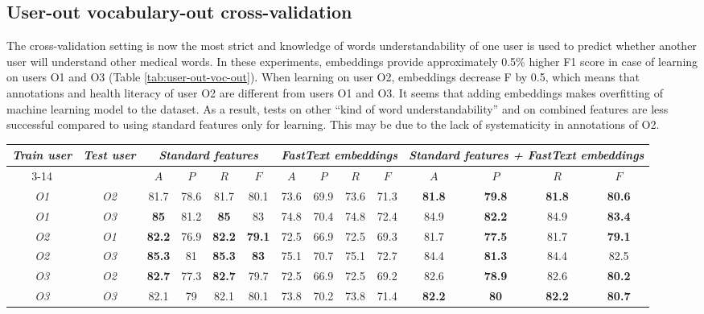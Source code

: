 \subsection{User-out vocabulary-out cross-validation}

The cross-validation setting is now the most strict and knowledge of words understandability of one user is used to predict whether another user will understand other medical words. In these experiments, embeddings provide approximately 0.5\% higher F1 score in case of learning on users O1 and O3 (Table \ref{tab:user-out-voc-out}). When learning on user O2, embeddings decrease F by 0.5, which means that annotations and health literacy of user O2 are different from users O1 and O3. It seems that adding embeddings makes overfitting of machine learning model to the dataset. As a result, tests on other ``kind of word understandability'' and on combined features are less successful compared to using standard features only for learning. This may be due to the lack of systematicity in annotations of O2.

\begin{table*}[h]
\begin{tabular}{cc|cccc|cccc|cccc}
\multirow{2}{0.6cm}{\textit{Train user}} & \multirow{2}{0.6cm}{\textit{Test user}} & \multicolumn{4}{c|}{\textit{Standard features}} & \multicolumn{4}{c|}{\textit{FastText embeddings}} & \multicolumn{4}{X}{\textit{Standard features + FastText embeddings}} \\ \cline{3-14} 
 &  & $A$ & $P$ & $R$ & $F$ & $A$ & $P$ & $R$ & $F$ & $A$ & $P$ & $R$ & $F$ \\ \hline
\textit{O1} & \textit{O2} & 81.7 & 78.6 & 81.7 & 80.1 & 73.6 & 69.9 & 73.6 & 71.3 & \textbf{81.8} & \textbf{79.8} & \textbf{81.8} & \textbf{80.6} \\ 
\textit{O1} & \textit{O3} & \textbf{85} & 81.2 & \textbf{85} & 83 & 74.8 & 70.4 & 74.8 & 72.4 & 84.9 & \textbf{82.2} & 84.9 & \textbf{83.4} \\ \hline 
\textit{O2} & \textit{O1} & \textbf{82.2} & 76.9 & \textbf{82.2} & \textbf{79.1} & 72.5 & 66.9 & 72.5 & 69.3 & 81.7 & \textbf{77.5} & 81.7 & \textbf{79.1} \\
\textit{O2} & \textit{O3} & \textbf{85.3} & 81 & \textbf{85.3} & \textbf{83} & 75.1 & 70.7 & 75.1 & 72.7 & 84.4 & \textbf{81.3} & 84.4 & 82.5 \\ \hline 
\textit{O3} & \textit{O2} & \textbf{82.7} & 77.3 & \textbf{82.7} & 79.7 & 72.5 & 66.9 & 72.5 & 69.2 & 82.6 & \textbf{78.9} & 82.6 & \textbf{80.2} \\ 
\textit{O3} & \textit{O3} & 82.1 & 79 & 82.1 & 80.1 & 73.8 & 70.2 & 73.8 & 71.4 & \textbf{82.2} & \textbf{80} & \textbf{82.2} & \textbf{80.7} \\ \hline 
\end{tabular}
    \caption{Experiments on user-out vocabulary-out cross-validation.}
    \label{tab:user-out-voc-out}
\end{table*}

